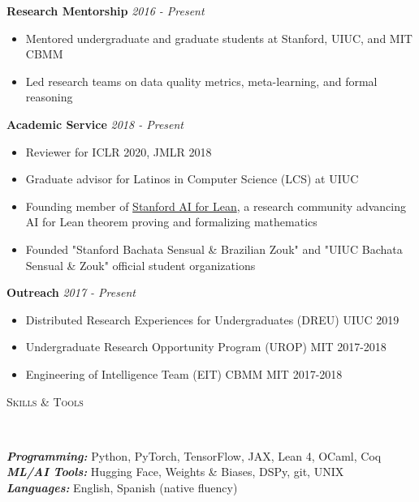 \documentclass{article}
\newenvironment{changemargin}[2]{%
  \begin{list}{}{%
    \setlength{\topsep}{0pt}%
    \setlength{\leftmargin}{#1}%
    \setlength{\rightmargin}{#2}%
    \setlength{\listparindent}{\parindent}%
    \setlength{\itemindent}{\parindent}%
    \setlength{\parsep}{\parskip}%
  }%
  \item[]}{\end{list}
}
\newcommand{\lineover}{
	\begin{changemargin}{-0.05in}{-0.05in}
		\vspace*{-8pt}
		\hrulefill \\
		\vspace*{-2pt}
	\end{changemargin}
}
\newcommand{\header}[1]{
	\begin{changemargin}{-0.5in}{-0.5in}
		\scshape{#1}\\
  	\lineover
	\end{changemargin}
}
\newenvironment{body} {
	\vspace*{-16pt}
	\begin{changemargin}{-0.25in}{-0.5in}
  }	
	{\end{changemargin}
}
\begin{document}
\begin{body}
    \vspace{11pt}

\textbf{Research Mentorship} \hfill \emph{2016 - Present}\\
\vspace*{-3pt}
\begin{itemize} \itemsep -2pt
    \item Mentored undergraduate and graduate students at Stanford, UIUC, and MIT CBMM
    \item Led research teams on data quality metrics, meta-learning, and formal reasoning
\end{itemize}
\vspace{5 pt}

\textbf{Academic Service} \hfill \emph{2018 - Present}\\
\vspace*{-3pt}
\begin{itemize} \itemsep -2pt
    \item Reviewer for ICLR 2020, JMLR 2018
    \item Graduate advisor for Latinos in Computer Science (LCS) at UIUC
    \item Founding member of \href{https://aiforlean.org/}{Stanford AI for Lean}, a research community advancing AI for Lean theorem proving and formalizing mathematics
    \item Founded "Stanford Bachata Sensual \& Brazilian Zouk" and "UIUC Bachata Sensual \& Zouk" official student organizations
\end{itemize}
\vspace{5 pt}

\textbf{Outreach} \hfill \emph{2017 - Present}\\
\vspace*{-3pt}
\begin{itemize} \itemsep -2pt
    \item Distributed Research Experiences for Undergraduates (DREU) UIUC 2019
    \item Undergraduate Research Opportunity Program (UROP) MIT 2017-2018 
    \item Engineering of Intelligence Team (EIT) CBMM MIT 2017-2018
\end{itemize}

\end{body}


\header{Skills \& Tools}
\begin{body}
	\vspace{14pt}
	\emph{\textbf{Programming:}}{} Python, PyTorch, TensorFlow, JAX, Lean 4, OCaml, Coq\\
	\smallskip
	\emph{\textbf{ML/AI Tools:}}{}  Hugging Face, Weights \& Biases, DSPy, git, UNIX\\
	\smallskip
	\emph{\textbf{Languages:}}{} English, Spanish (native fluency)\\
\end{body}
\end{document}
